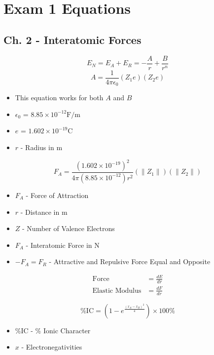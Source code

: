 \section{Exam 1 Equations} \label{sec:Exam 1}
	\subsection{Ch. 2 - Interatomic Forces}
		\begin{equation}
			E_{N} = E_{A} + E_{R} = -\frac{A}{r} + \frac{B}{r^{n}}
		\end{equation}
		\begin{equation}
			A = \frac{1}{4 \pi \epsilon_{0}} \left( Z_{1} e \right) \left( Z_{2} e \right)
		\end{equation}
		\begin{itemize}[noitemsep]
			\item This equation works for both $A$ and $B$
			\item $\epsilon_{0}$ = $8.85 \times 10^{-12} \si{\farad / \meter}$
			\item $e$ = $1.602 \times 10^{-19} \si{\coulomb}$
			\item $r$ - Radius in \si{\meter}
		\end{itemize}

		\begin{equation}
			F_{A} = \frac{\left( 1.602 \times 10^{-19} \right)^{2}}{4 \pi \left( 8.85 \times 10^{-12} \right) r^{2}} \left( \lVert Z_{1} \rVert \right) \left( \lVert Z_{2} \rVert \right)
		\end{equation}
		\begin{itemize}[noitemsep]
			\item $F_{A}$ - Force of Attraction
			\item $r$ - Distance in \si{\meter}
			\item $Z$ - Number of Valence Electrons
			\item $F_{A}$ - Interatomic Force in \si{\newton}
			\item $-F_{A} = F_{R}$ - Attractive and Repulsive Force Equal and Opposite
		\end{itemize}

		\begin{align}
			\text{Force} &= \frac{dE}{dr} \\
			\text{Elastic Modulus} &= \frac{dF}{dr}
		\end{align}
	
		\begin{equation}
			\text{\%IC} = \left( 1 - e^{\frac{\left( x_{A}-x_{B} \right)^{2}}{4}} \right) \times 100\%
		\end{equation}
		\begin{itemize}[noitemsep]
			\item $\text{\%IC}$ - \% Ionic Character
			\item $x$ - Electronegativities
		\end{itemize}
	
